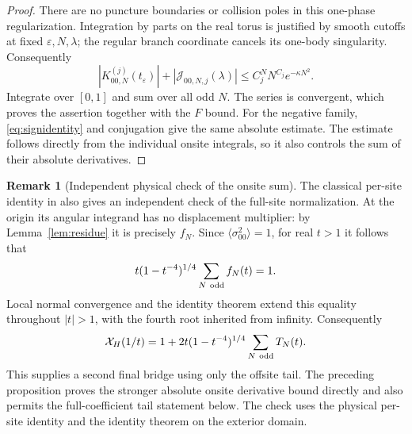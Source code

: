 \documentclass[11pt]{article}
\numberwithin{equation}{section}
\theoremstyle{definition}
\newtheorem{remark}[theorem]{Remark}
\newcommand{\eps}{\varepsilon}
\begin{document}
\begin{proof}
There are no puncture boundaries or collision poles in this
one-phase regularization. Integration by parts on the real torus
is justified by smooth cutoffs at fixed $\eps,N,\lambda$; the
regular branch coordinate cancels its one-body singularity.
Consequently
\[
 |K_{00,N}^{(j)}(t_\eps)|+
 |\mathcal J_{00,N,j}(\lambda)|
 \le C_j^N N^{C_j}e^{-\kappa N^2}.
\]
Integrate over $[0,1]$ and sum over all odd $N$. The series is
convergent, which proves the assertion together with the $F$ bound.
For the negative family, \eqref{eq:signidentity} and conjugation
give the same absolute estimate. The estimate follows directly from the individual onsite integrals,
so it also controls the sum of their absolute derivatives.
\end{proof}

\begin{remark}[Independent physical check of the onsite sum]
The classical per-site identity in \cite[eqs.~(4.1)--(4.2)]{Orrick2001}
also gives an independent check of the full-site normalization.
At the origin its angular integrand has no displacement multiplier:
by Lemma~\ref{lem:residue} it is precisely $f_N$.
Since $\langle\sigma_{00}^2\rangle=1$, for real $t>1$ it follows that
\[
 t(1-t^{-4})^{1/4}\sum_{N\ {\rm odd}}f_N(t)=1.
\]
Local normal convergence and the identity theorem extend this equality
throughout $|t|>1$, with the fourth root inherited from infinity.
Consequently
\[
 \mathcal X_H(1/t)=1+2t(1-t^{-4})^{1/4}
                    \sum_{N\ {\rm odd}}T_N(t).
\]
This supplies a second final bridge using only the offsite tail.
The preceding proposition proves the stronger absolute onsite
derivative bound directly and also permits the full-coefficient
tail statement below. The check uses the physical per-site identity and the identity theorem
on the exterior domain.
\end{remark}
\end{document}
